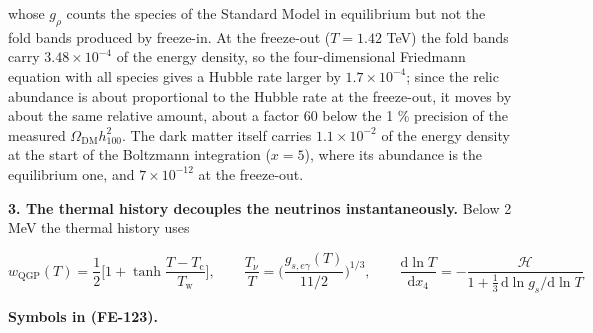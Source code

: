 \documentclass[
  10pt,
]{article}
\begin{document}
whose \(g_\rho\) counts the species of the Standard Model in equilibrium
but not the fold bands produced by freeze-in. At the freeze-out
(\(T = 1.42\) TeV) the fold bands carry \(3.48\times10^{-4}\) of the
energy density, so the four-dimensional Friedmann equation with all
species gives a Hubble rate larger by \(1.7\times10^{-4}\); since the
relic abundance is about proportional to the Hubble rate at the
freeze-out, it moves by about the same relative amount, about a factor
60 below the 1 \% precision of the measured
\(\Omega_{\mathrm{DM}}h_{100}^2\). The dark matter itself carries
\(1.1\times10^{-2}\) of the energy density at the start of the Boltzmann
integration (\(x = 5\)), where its abundance is the equilibrium one, and
\(7\times10^{-12}\) at the freeze-out.

\textbf{3. The thermal history decouples the neutrinos instantaneously.}
Below 2 MeV the thermal history uses

\[
w_{\mathrm{QGP}}(T) = \frac12\Big[1 + \tanh\frac{T - T_{\mathrm{c}}}{T_{\mathrm{w}}}\Big],\qquad
\frac{T_\nu}{T} = \Big(\frac{g_{s,e\gamma}(T)}{11/2}\Big)^{1/3},\qquad
\frac{\mathrm{d}\ln T}{\mathrm{d}x_4} = -\frac{\mathcal{H}}{1 + \frac13\,\mathrm{d}\ln g_s/\mathrm{d}\ln
 T} \tag{FE-123}
\]

\textbf{Symbols in (FE-123).}
\end{document}
